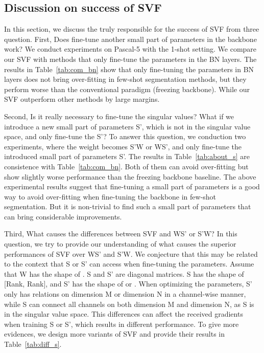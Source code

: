 \documentclass{article}
\begin{document}
\clearpage
\subsection{Discussion on success of SVF}
In this section, we discuss the truly responsible for the success of SVF from three question. First, Does fine-tune another small part of parameters in the backbone work? We conduct experiments on Pascal-5 with the 1-shot setting. We compare our SVF with methods that only fine-tune the parameters in the BN layers. The results in Table~\ref{tab:com_bn} show that only fine-tuning the parameters in BN layers does not bring over-fitting in few-shot segmentation methods, but they perform worse than the conventional paradigm (freezing backbone). While our SVF outperform other methods by large margins.

Second, Is it really necessary to fine-tune the singular values? What if we introduce a new small part of parameters S', which is not in the singular value space, and only fine-tune the S'? To answer this question, we conduction two experiments, where the weight becomes S'W or WS', and only fine-tune the introduced small part of parameters S'. The results in Table~\ref{tab:about_s} are consistence with Table~\ref{tab:com_bn}. Both of them can avoid over-fitting but show slightly worse performance than the freezing backbone baseline. The above experimental results suggest that fine-tuning a small part of parameters is a good way to avoid over-fitting when fine-tuning the backbone in few-shot segmentation. But it is non-trivial to find such a small part of parameters that can bring considerable improvements.

Third, What causes the differences between SVF and WS' or S'W?  In this question, we try to provide our understanding of what causes the superior performances of SVF over WS' and S'W. We conjecture that this may be related to the context that S or S' can access when fine-tuning the parameters. Assume that W has the shape of . S and S' are diagonal matrices. S has the shape of [Rank, Rank], and S' has the shape of  or . When optimizing the parameters, S' only has relations on dimension M or dimension N in a channel-wise manner, while S can connect all channels on both dimension M and dimension N, as S is in the singular value space. This differences can affect the received gradients when training S or S', which results in different performance. To give more evidences, we design more variants of SVF and provide their results in Table~\ref{tab:diff_s}.
\end{document}
